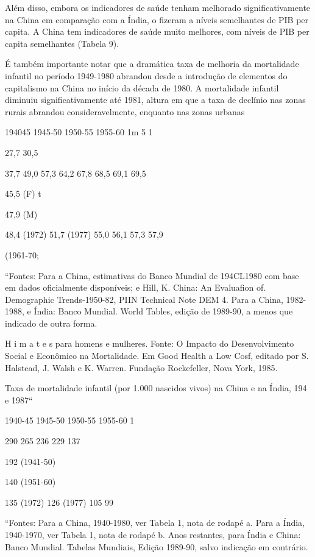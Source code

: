 \documentclass[twocolumn,amsmath,amssymb,aps,pre,floatfix]{revtex4-2}
\begin{document}
\par
Além disso, embora os indicadores de saúde tenham melhorado significativamente na China em comparação com a Índia, o fizeram a níveis semelhantes de PIB per capita. A China tem indicadores de saúde muito melhores, com níveis de PIB per capita semelhantes (Tabela 9).
\par
É também importante notar que a dramática taxa de melhoria da mortalidade infantil no período 1949-1980 abrandou desde a introdução de elementos do capitalismo na China no início da década de 1980. A mortalidade infantil diminuiu significativamente até 1981, altura em que a taxa de declínio nas zonas rurais abrandou consideravelmente, enquanto nas zonas urbanas
\par
194045 1945-50 1950-55 1955-60 1m 5 1%
\par
27,7 30,5
\par
37,7 49,0 57,3 64,2 67,8 68,5 69,1 69,5
\par
45,5 (F) t
\par
47,9 (M)
\par
48,4 (1972) 51,7 (1977) 55,0 56,1 57,3 57,9
\par
(1961-70;
\par
“Fontes: Para a China, estimativas do Banco Mundial de 194CL1980 com base em dados oficialmente disponíveis; e Hill, K. China: An Evaluafion of. Demographic Trends-1950-82, PIIN Technical Note DEM 4. Para a China, 1982-1988, e Índia: Banco Mundial. World Tables, edição de 1989-90, a menos que indicado de outra forma.
\par
H i m a t e s para homens e mulheres. Fonte: O Impacto do Desenvolvimento Social e Econômico na Mortalidade. Em Good Health a Low Cosf, editado por S. Halstead, J. Walsh e K. Warren. Fundação Rockefeller, Nova York, 1985.
\par
Taxa de mortalidade infantil (por 1.000 nascidos vivos) na China e na Índia, 194 e 1987“
\par
1940-45 1945-50 1950-55 1955-60 1%
\par
290 265 236 229 137%
\par
192 (1941-50)
\par
140 (1951-60)
\par
135 (1972) 126 (1977) 105 99
\par
“Fontes: Para a China, 1940-1980, ver Tabela 1, nota de rodapé a. Para a Índia, 1940-1970, ver Tabela 1, nota de rodapé b. Anos restantes, para Índia e China: Banco Mundial. Tabelas Mundiais, Edição 1989-90, salvo indicação em contrário.
\end{document}
